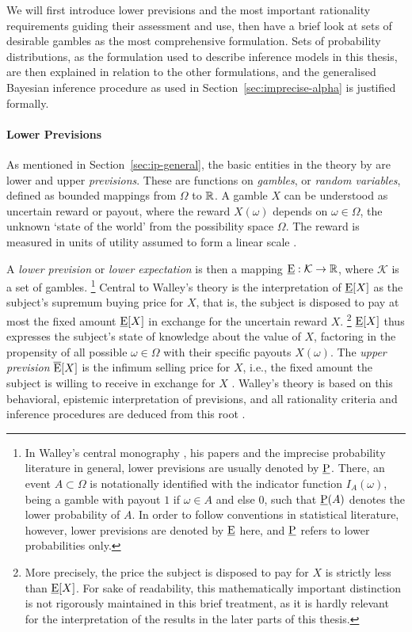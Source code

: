We will first introduce lower previsions
and the most important rationality requirements guiding their assessment and use,
then have a brief look at sets of desirable gambles as the most comprehensive formulation.
Sets of probability distributions, as the formulation used to describe inference models in this thesis,
are then explained in relation to the other formulations,
and the generalised Bayesian inference procedure as used in Section~\ref{sec:imprecise-alpha} is justified formally.

\paragraph{Lower Previsions}

As mentioned in Section~\ref{sec:ip-general}, the basic entities in the theory by \textcite{1991:walley}
are lower and upper \emph{previsions}.
These are functions on \emph{gambles}, or \emph{random variables},
defined as bounded mappings from $\Omega$ to $\mathbb{R}$.
A gamble $X$ can be understood as uncertain reward or payout,
where the reward $X(\omega)$ depends on $\omega \in \Omega$,
the unknown `state of the world' from the possibility space $\Omega$.
The reward is measured in units of utility assumed to form a linear scale
\parencite[\S 2.2]{1991:walley}.

A \emph{lower prevision} or \emph{lower expectation} is then a mapping
$\underline{\operatorname{E}}: \mathcal{K} \to \mathbb{R}$, where $\mathcal{K}$ is a set of gambles.%
\footnote{In Walley's central monography \parencite{1991:walley},
his papers and the imprecise probability literature in general,
lower previsions are usually denoted by $\underline{\operatorname{P}}$.
There, an event $A \subset \Omega$ is notationally identified with the
indicator function $I_A(\omega)$, being a gamble with payout $1$ if $\omega \in A$ and else $0$,
such that $\underline{\operatorname{P}}(A)$ denotes the lower probability of $A$.
In order to follow conventions in statistical literature, however,
lower previsions are denoted by $\underline{\operatorname{E}}$ here,
and $\underline{\operatorname{P}}$ refers to lower probabilities only.}
Central to Walley's theory is the interpretation of $\underline{\operatorname{E}}[X]$
as the subject's supremum buying price for $X$, that is,
the subject is disposed to pay at most the fixed amount $\underline{\operatorname{E}}[X]$
in exchange for the uncertain reward $X$.%
\footnote{More precisely, the price the subject is disposed to pay for $X$ is strictly less than $\underline{\operatorname{E}}[X]$.
For sake of readability,
this mathematically important distinction is not rigorously maintained in this brief treatment,
as it is hardly relevant for the interpretation of the results in the later parts of this thesis.}
$\underline{\operatorname{E}}[X]$ thus expresses the subject's state of knowledge about the value of $X$,
factoring in the propensity of all possible $\omega \in \Omega$
with their specific payouts $X(\omega)$.
The \emph{upper prevision} $\overline{\operatorname{E}}[X]$ is the infimum selling price for $X$,
i.e., the fixed amount the subject is willing to receive in exchange for $X$
\parencite[p.~9]{1996:walley::expert}.
Walley's theory is based on this behavioral, epistemic interpretation of previsions,
and all rationality criteria and inference procedures
are deduced from this root \parencite[p.~5]{1996:walley::expert}.

